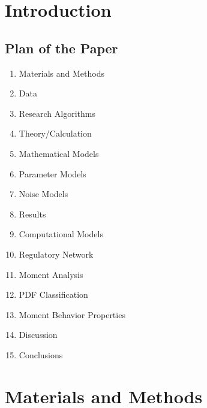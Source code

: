 

\section{Introduction}

\subsection{Plan of the Paper}

\begin{enumerate}
	\item Materials and Methods
	\item Data
	\item Research Algorithms
	\item Theory/Calculation
	\item Mathematical Models
	\item Parameter Models
	\item Noise Models
	\item Results
	\item Computational Models
	\item Regulatory Network
	\item Moment Analysis
	\item PDF Classification
	\item Moment Behavior Properties
	\item Discussion
	\item Conclusions
\end{enumerate}


\section{Materials and Methods}
